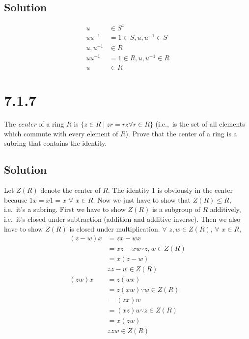 \documentclass[fleqn]{article}
\begin{document}
        \subsection{Solution}
        \begin{align}
            u &\in S^x \\
            u u^{-1} &= 1 \in S, u, u^{-1} \in S \\
            u, u^{-1} &\in R \\
            u u^{-1} &= 1 \in R, u, u^{-1} \in R \\
            u &\in R
        \end{align}
    
    \section{7.1.7}
    The \textit{center} of a ring $R$ is $\{z \in R \mid zr = rz \forall r \in R\}$ (i.e.,\ is the set of all elements which commute with every element of $R$).  Prove that the center of a ring is a subring that contains the identity.
        
        \subsection{Solution}
        Let $Z(R)$ denote the center of $R$.  The identity 1 is obviously in the center because $1x = x1 = x$ $\forall$ $x \in R$.  Now we just have to show that $Z(R) \leq R$, i.e.\ it's a subring.  First we have to show $Z(R)$ is a subgroup of $R$ additively, i.e.\ it's closed under subtraction (addition and additive inverse).  Then we also have to show $Z(R)$ is closed under multiplication.  $\forall$ $z, w \in Z(R)$, $\forall$ $x \in R$,
        \begin{align}
            (z - w)x &= zx - wx \\
                &= xz - xw \because{} z, w \in Z(R) \\
                &= x(z - w) \\
            &\therefore{} z - w \in Z(R) \\
            (zw)x &= z(wx) \\
                &= z(xw) \because{} w \in Z(R) \\
                &= (zx)w \\
                &= (xz)w \because{} z \in Z(R) \\
                &= x(zw) \\
            &\therefore{} zw \in Z(R) \\
        \end{align}
    
\end{document}
